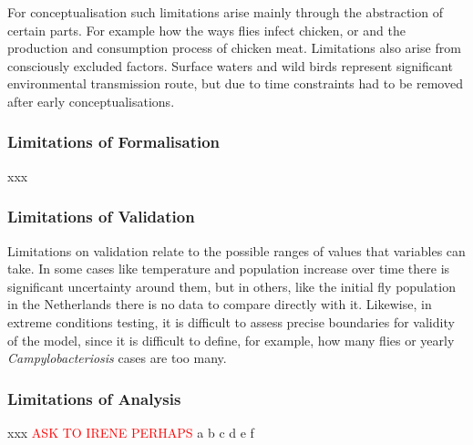 For conceptualisation such limitations arise mainly through the abstraction of certain parts. For example how the ways flies infect chicken, or and the production and consumption process of chicken meat. Limitations also arise from consciously excluded factors. Surface waters and wild birds represent significant environmental transmission route, but due to time constraints had to be removed after early conceptualisations. 


\subsubsection{Limitations of Formalisation}
xxx

\subsubsection{Limitations of Validation}

Limitations on validation relate to the possible ranges of values that variables can take. In some cases like temperature and population increase over time there is significant uncertainty around them, but in others, like the initial fly population in the Netherlands there is no data to compare directly with it. Likewise, in extreme conditions testing, it is difficult to assess precise boundaries for validity of the model, since it is difficult to define, for example, how many flies or yearly \textit{Campylobacteriosis} cases are too many.

\subsubsection{Limitations of Analysis}
xxx
\textcolor{red}{ASK TO IRENE PERHAPS}
a b c d e f

